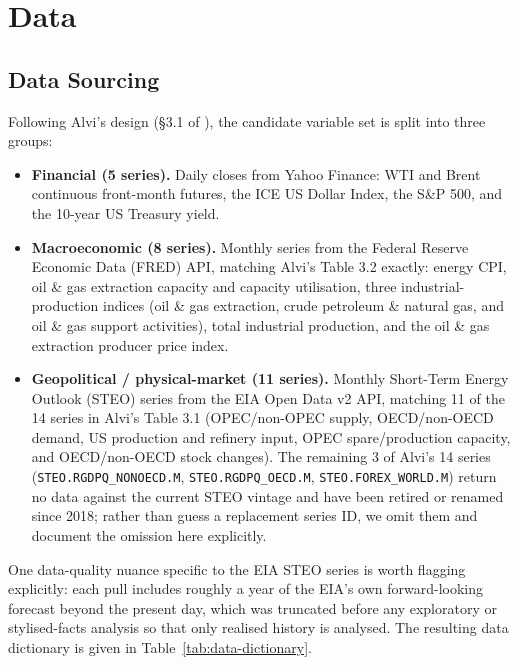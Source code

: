 \section{Data}
\label{sec:data}

\subsection{Data Sourcing}

Following Alvi's design (\S3.1 of \autocite{alvi2018pgm}), the candidate variable set is split into three groups:

\begin{itemize}
  \item \textbf{Financial (5 series).} Daily closes from Yahoo Finance: WTI and Brent continuous front-month futures, the ICE
    US Dollar Index, the S\&P 500, and the 10-year US Treasury yield.
  \item \textbf{Macroeconomic (8 series).} Monthly series from the Federal
    Reserve Economic Data (FRED) API, matching Alvi's Table 3.2 exactly:
    energy CPI, oil \& gas extraction capacity and capacity utilisation,
    three industrial-production indices (oil \& gas extraction, crude
    petroleum \& natural gas, and oil \& gas support activities), total
    industrial production, and the oil \& gas extraction producer price
    index.
  \item \textbf{Geopolitical / physical-market (11 series).} Monthly Short-Term
    Energy Outlook (STEO) series from the EIA Open Data v2 API, matching 11
    of the 14 series in Alvi's Table 3.1 (OPEC/non-OPEC supply, OECD/non-OECD
    demand, US production and refinery input, OPEC spare/production
    capacity, and OECD/non-OECD stock changes). The remaining 3 of Alvi's 14
    series (\texttt{STEO.RGDPQ\_NONOECD.M}, \texttt{STEO.RGDPQ\_OECD.M},
    \texttt{STEO.FOREX\_WORLD.M}) return no data against the current STEO
    vintage and have been retired or renamed since 2018; rather than guess a
    replacement series ID, we omit them and document the omission here
    explicitly.
\end{itemize}

One data-quality nuance specific to the EIA STEO series is worth flagging explicitly: each pull includes roughly a year of the EIA's own forward-looking forecast beyond the present day, which was truncated before any exploratory or stylised-facts analysis so that only realised history is analysed. The resulting data dictionary is given in Table~\ref{tab:data-dictionary}.

